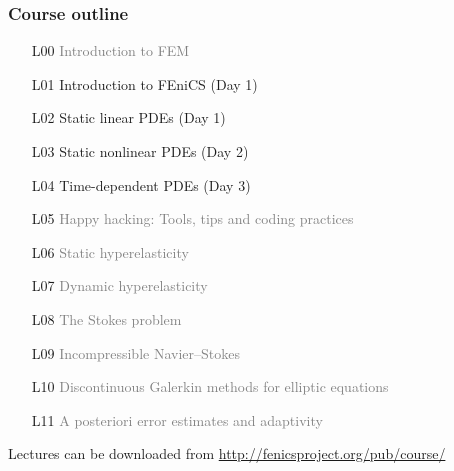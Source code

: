 \documentclass{fenicscourse}
\begin{document}

\begin{frame}
  \frametitle{Course outline}


  \small

  \begin{enumerate}
  \item[L00]
    \textcolor{grey}{Introduction to FEM}
  \item[L01]
    Introduction to FEniCS (Day 1)
  \item[L02]
    Static linear PDEs     (Day 1)
  \item[L03]
    Static nonlinear PDEs  (Day 2)
  \item[L04]
    Time-dependent PDEs    (Day 3)
  \item[L05]
    \textcolor{grey}{Happy hacking: Tools, tips and coding practices}
  \item[L06]
    \textcolor{grey}{Static hyperelasticity}
  \item[L07]
    \textcolor{grey}{Dynamic hyperelasticity}
  \item[L08]
    \textcolor{grey}{The Stokes problem}
  \item[L09]
    \textcolor{grey}{Incompressible Navier--Stokes}
  \item[L10]
    \textcolor{grey}{Discontinuous Galerkin methods for elliptic equations}
  \item[L11]
    \textcolor{grey}{A posteriori error estimates and adaptivity}
  \end{enumerate}

  \normalsize

  {\footnotesize Lectures can be downloaded from
    \url{http://fenicsproject.org/pub/course/}}
\end{frame}











\end{document}
